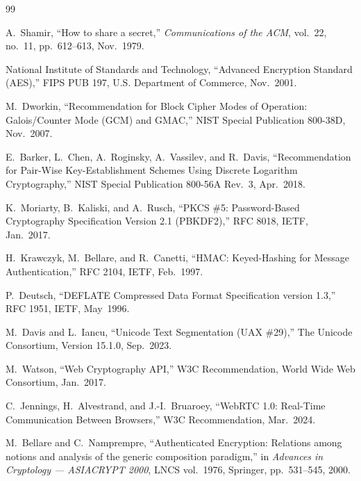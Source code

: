 \documentclass[12pt,a4paper,oneside,openany]{report}
\begin{document}
\renewcommand{\bibname}{References}
\begin{thebibliography}{99}

A.~Shamir, ``How to share a secret,'' \textit{Communications of the ACM}, vol.~22, no.~11, pp.~612--613, Nov.~1979.

National Institute of Standards and Technology, ``Advanced Encryption Standard (AES),'' FIPS PUB 197, U.S. Department of Commerce, Nov.~2001.

M.~Dworkin, ``Recommendation for Block Cipher Modes of Operation: Galois/Counter Mode (GCM) and GMAC,'' NIST Special Publication 800-38D, Nov.~2007.

E.~Barker, L.~Chen, A.~Roginsky, A.~Vassilev, and R.~Davis, ``Recommendation for Pair-Wise Key-Establishment Schemes Using Discrete Logarithm Cryptography,'' NIST Special Publication 800-56A Rev.~3, Apr.~2018.

K.~Moriarty, B.~Kaliski, and A.~Rusch, ``PKCS \#5: Password-Based Cryptography Specification Version 2.1 (PBKDF2),'' RFC 8018, IETF, Jan.~2017.

H.~Krawczyk, M.~Bellare, and R.~Canetti, ``HMAC: Keyed-Hashing for Message Authentication,'' RFC 2104, IETF, Feb.~1997.

P.~Deutsch, ``DEFLATE Compressed Data Format Specification version 1.3,'' RFC 1951, IETF, May~1996.

M.~Davis and L.~Iancu, ``Unicode Text Segmentation (UAX \#29),'' The Unicode Consortium, Version 15.1.0, Sep.~2023.

M.~Watson, ``Web Cryptography API,'' W3C Recommendation, World Wide Web Consortium, Jan.~2017.

C.~Jennings, H.~Alvestrand, and J.-I.~Bruaroey, ``WebRTC 1.0: Real-Time Communication Between Browsers,'' W3C Recommendation, Mar.~2024.

M.~Bellare and C.~Namprempre, ``Authenticated Encryption: Relations among notions and analysis of the generic composition paradigm,'' in \textit{Advances in Cryptology --- ASIACRYPT 2000}, LNCS vol.~1976, Springer, pp.~531--545, 2000.

\end{thebibliography}
\end{document}
